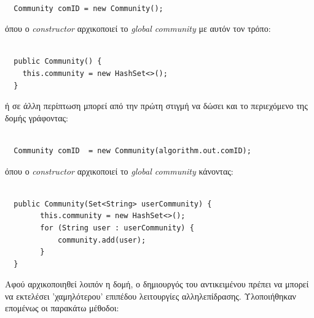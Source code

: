 \begin{lstlisting}[frame=single]  % Start your code-block

  Community comID = new Community();
\end{lstlisting}
 
  
  όπου ο \emph{constructor} αρχικοποιεί το \emph{global community} με αυτόν τον τρόπο:
  
\begin{lstlisting}[frame=single]  % Start your code-block

  public Community() {
    this.community = new HashSet<>();
  }
\end{lstlisting}
 

  ή σε άλλη περίπτωση μπορεί από την πρώτη στιγμή να δώσει και το περιεχόμενο της δομής γράφοντας:
\begin{lstlisting}[frame=single]  % Start your code-block

  Community comID  = new Community(algorithm.out.comID);
\end{lstlisting}

 
  
  όπου ο \emph{constructor} αρχικοποιεί το \emph{global community} κάνοντας:
  
\begin{lstlisting}[frame=single]  % Start your code-block

  public Community(Set<String> userCommunity) {
        this.community = new HashSet<>();
        for (String user : userCommunity) {
            community.add(user);
        }
  }
\end{lstlisting}
  


Αφού αρχικοποιηθεί λοιπόν η δομή, ο δημιουργός του αντικειμένου πρέπει να μπορεί να εκτελέσει 'χαμηλότερου' επιπέδου λειτουργίες αλληλεπίδρασης. Υλοποιήθηκαν επομένως οι παρακάτω
μέθοδοι:


